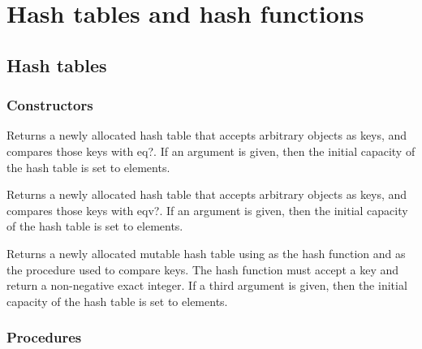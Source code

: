 \documentclass[twoside]{algol60}
\begin{document}
\chapter{Hash tables and hash functions}


\section{Hash tables}

\subsection{Constructors}


\begin{entry}{%
}

Returns a newly allocated hash table that accepts arbitrary objects as keys, 
and compares those keys with {\cf eq?}. If an argument is given, then the initial 
capacity of the hash table is set to  elements.

\end{entry}

\begin{entry}{%
}

Returns a newly allocated hash table that accepts arbitrary objects as keys, 
and compares those keys with {\cf eqv?}. If an argument is given, then the initial 
capacity of the hash table is set to  elements.

\end{entry}

\begin{entry}{%
}

Returns a newly allocated mutable hash table using  
as the hash function and  as the procedure used to 
compare keys.  The hash function must accept a key and return a 
non-negative exact integer. If a third argument is given, then the 
initial capacity of the hash table is set to  elements.

\end{entry}

\subsection{Procedures}
\end{document}
